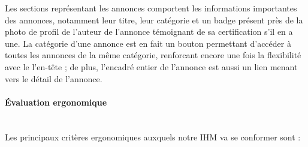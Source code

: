 \documentclass[a4paper,11pt]{article}
\begin{document}
Les sections représentant les annonces comportent les informations importantes des
annonces, notamment leur titre, leur catégorie et un badge présent près de la photo de profil
de l'auteur de l'annonce témoignant de sa certification s'il en a une. La catégorie d'une annonce
est en fait un bouton permettant d'accéder à toutes les annonces de la même catégorie,
renforcant encore une fois la flexibilité avec le l'en-tête ; de plus, l'encadré entier de l'annonce
est aussi un lien menant vers le détail de l'annonce.\\

\paragraph{Évaluation ergonomique}\mbox{} \\

Les principaux critères ergonomiques auxquels notre IHM va se conformer sont :\\
\end{document}
